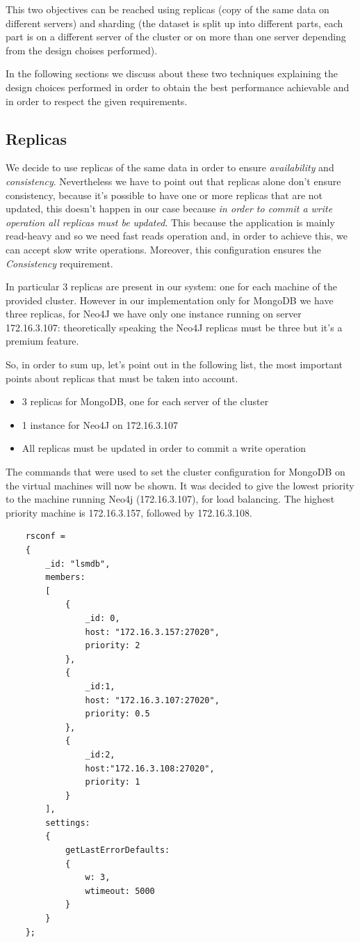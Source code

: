 \documentclass[a4paper]{report}
\begin{document}
\noindent This two objectives can be reached using replicas (copy of the same data on different servers) and sharding (the dataset is split up into different parts, each part is on a different server of the cluster or on more than one server depending from the design choises performed).

\noindent In the following sections we discuss about these two techniques explaining the design choices performed in order to obtain the best performance achievable and in order to respect the given requirements. 

\subsection{Replicas}
We decide to use replicas of the same data in order to ensure \emph{availability} and \emph{consistency}. Nevertheless we have to point out that replicas alone don't ensure consistency, because it's possible to have one or more replicas that are not updated, this doesn't happen in our case because \emph{in order to commit a write operation all replicas must be updated}. This because the application is mainly read-heavy and so we need fast reads operation and, in order to achieve this, we can accept slow write operations. Moreover, this configuration ensures the \emph{Consistency} requirement.

\noindent \noindent In particular 3 replicas are present in our system: one for each machine of the provided cluster. However in our implementation only for MongoDB we have three replicas, for Neo4J we have only one instance running on server 172.16.3.107: theoretically speaking the Neo4J replicas must be three but it's a premium feature.

\noindent So, in order to sum up, let's point out in the following list, the most important points about replicas that must be taken into account.
\begin{itemize}
	\item 3 replicas for MongoDB, one for each server of the cluster
	\item 1 instance for Neo4J on 172.16.3.107
	\item All replicas must be updated in order to commit a write operation
\end{itemize}

\noindent The commands that were used to set the cluster configuration for MongoDB on the virtual machines will now be shown. It was decided to give the lowest priority to the machine running Neo4j (172.16.3.107), for load balancing. The highest priority machine is 172.16.3.157, followed by 172.16.3.108.
\begin{lstlisting}
	rsconf = 
	{
		_id: "lsmdb", 
		members: 
		[
			{
				_id: 0, 
				host: "172.16.3.157:27020", 
				priority: 2
			}, 
			{
				_id:1, 
				host: "172.16.3.107:27020", 
				priority: 0.5
			}, 
			{
				_id:2, 
				host:"172.16.3.108:27020", 
				priority: 1
			}
		], 
		settings: 
		{
			getLastErrorDefaults: 
			{
				w: 3, 
				wtimeout: 5000
			}
		}
	};	
\end{lstlisting} 
\end{document}
